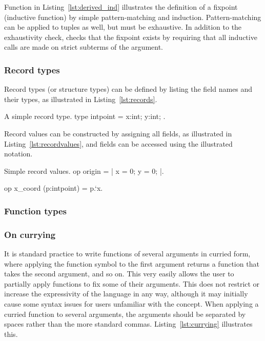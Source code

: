 Function  in Listing~\ref{lst:derived_ind} illustrates the
definition of a fixpoint (inductive function) by simple pattern-matching and
induction. Pattern-matching can be applied to tuples as well, but must be
exhaustive. In addition to the exhaustivity check, \WhyThree checks that the
fixpoint exists by requiring that all inductive calls are made on strict
subterms of the argument.

\subsubsection*{Record types}
Record types (or structure types) can be defined by listing the field names and
their types, as illustrated in Listing~\ref{lst:records}.

\begin{easycrypt}[label={lst:records}]{A simple record type.}
type intpoint = { x:int; y:int; }.
\end{easycrypt}

Record values can be constructed by assigning all fields, as illustrated in
Listing~\ref{lst:recordvalues}, and fields can be accessed using the
illustrated notation.

\begin{easycrypt}[label={lst:recordvalues}]{Simple record values.}
op origin = {| x = 0; y = 0; |}.

op x_coord (p:intpoint) = p.`x.
\end{easycrypt}

\subsubsection*{Function types}

\subsubsection*{On currying}
It is standard practice to write functions of several arguments in curried form,
where applying the function symbol to the first argument returns a function that
takes the second argument, and so on. This very easily allows the user to
partially apply functions to fix some of their arguments. This does not restrict
or increase the expressivity of the language in any way, although it may
initially cause some syntax issues for users unfamiliar with the concept. When
applying a curried function to several arguments, the arguments should be
separated by spaces rather than the more standard commas.
Listing~\ref{lst:currying} illustrates this.

